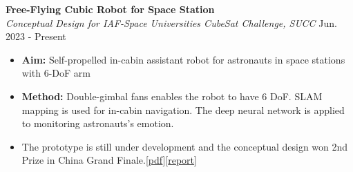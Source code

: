 \documentclass[11pt, a4paper]{article}
\begin{document}
\begin{researchitem}
    \item \textbf{Free-Flying Cubic Robot for Space Station}  \\
    \textit{Conceptual Design for IAF-Space Universities CubeSat Challenge, SUCC} \hfill Jun. 2023 - Present
    \begin{itemize}[noitemsep, topsep=0pt]
        \item \textbf{Aim:} Self-propelled in-cabin assistant robot for astronauts in space stations with 6-DoF arm
        \item \textbf{Method:} Double-gimbal fans enables the robot to have 6 DoF. SLAM mapping is used for in-cabin navigation. The deep neural network is applied to monitoring astronauts's emotion. 
        \item The prototype is still under development and the conceptual design won 2nd Prize in China Grand Finale.[\href{https://zcen-xiong.github.io/research/02free.pdf}{pdf}][\href{https://mp.weixin.qq.com/s?__biz=MzA5NzQwMjUzMg==&mid=2650824069&idx=1&sn=1aa2c5e4f50ce2fb39845a3b38718cfe&chksm=8b55964ebc221f58abd35f3c30a49a2afe5fb5d50f456de1eccbe1197932b0c5eed96b31c7e7&scene=27}{report}]
        
        
    \end{itemize}
\end{researchitem}    
\end{document}
